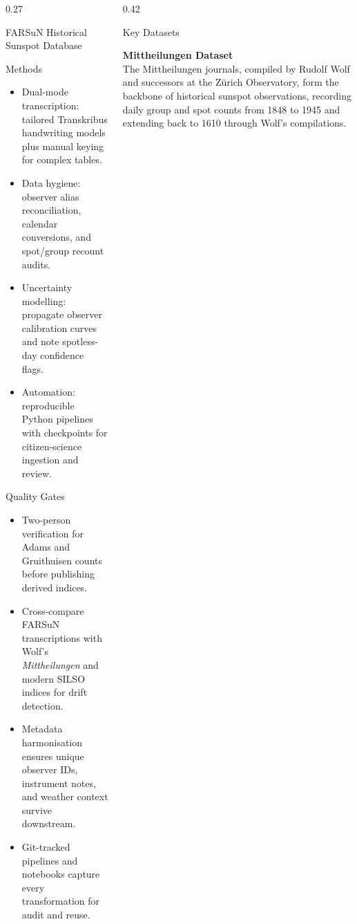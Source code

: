 \documentclass[final]{beamer}
\newenvironment{tightblock}[1]{%
  \begin{block}{#1}\vspace{0.35em}
}{\end{block}}
\begin{document}
\begin{frame}[t]
\begin{columns}[t,totalwidth=0.98\paperwidth]
\begin{column}{0.27\paperwidth}
\begin{tightblock}{FARSuN Historical Sunspot Database}
\end{tightblock}

\begin{tightblock}{Methods}
\begin{itemize}
  \item Dual-mode transcription: tailored Transkribus handwriting models plus manual keying for complex tables.
  \item Data hygiene: observer alias reconciliation, calendar conversions, and spot/group recount audits.
  \item Uncertainty modelling: propagate observer calibration curves and note spotless-day confidence flags.
  \item Automation: reproducible Python pipelines with checkpoints for citizen-science ingestion and review.
\end{itemize}
\end{tightblock}

\begin{tightblock}{Quality Gates}
\begin{itemize}
  \item Two-person verification for Adams and Gruithuisen counts before publishing derived indices.
  \item Cross-compare FARSuN transcriptions with Wolf's \emph{Mittheilungen} and modern SILSO indices for drift detection.
  \item Metadata harmonisation ensures unique observer IDs, instrument notes, and weather context survive downstream.
  \item Git-tracked pipelines and notebooks capture every transformation for audit and reuse.
\end{itemize}
\end{tightblock}

\end{column}


\begin{column}{0.42\paperwidth}
\begin{tightblock}{Key Datasets}
  \textbf{Mittheilungen Dataset}\\ %
The Mittheilungen journals, compiled by Rudolf Wolf and successors at the Zürich Observatory, form the backbone of historical sunspot observations, recording daily group and spot counts from 1848 to 1945 and extending back to 1610 through Wolf's compilations.%


\end{tightblock}
\end{column}
\end{columns}
\end{frame}
\end{document}
